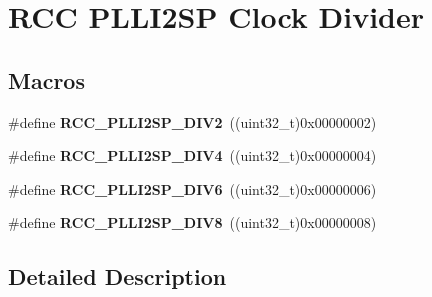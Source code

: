 \hypertarget{group___r_c_c_ex___p_l_l_i2_s_p___clock___divider}{}\section{R\+CC P\+L\+L\+I2\+SP Clock Divider}
\label{group___r_c_c_ex___p_l_l_i2_s_p___clock___divider}
\subsection*{Macros}
\begin{DoxyCompactItemize}
\item 
\#define {\bfseries R\+C\+C\+\_\+\+P\+L\+L\+I2\+S\+P\+\_\+\+D\+I\+V2}~((uint32\+\_\+t)0x00000002)\hypertarget{group___r_c_c_ex___p_l_l_i2_s_p___clock___divider_gac21a8fef45936bccd505019187d36464}{}\label{group___r_c_c_ex___p_l_l_i2_s_p___clock___divider_gac21a8fef45936bccd505019187d36464}

\item 
\#define {\bfseries R\+C\+C\+\_\+\+P\+L\+L\+I2\+S\+P\+\_\+\+D\+I\+V4}~((uint32\+\_\+t)0x00000004)\hypertarget{group___r_c_c_ex___p_l_l_i2_s_p___clock___divider_gac59b669903c841d46cc552887749807a}{}\label{group___r_c_c_ex___p_l_l_i2_s_p___clock___divider_gac59b669903c841d46cc552887749807a}

\item 
\#define {\bfseries R\+C\+C\+\_\+\+P\+L\+L\+I2\+S\+P\+\_\+\+D\+I\+V6}~((uint32\+\_\+t)0x00000006)\hypertarget{group___r_c_c_ex___p_l_l_i2_s_p___clock___divider_ga4f6407aa49b6d86cb036f68de40b7301}{}\label{group___r_c_c_ex___p_l_l_i2_s_p___clock___divider_ga4f6407aa49b6d86cb036f68de40b7301}

\item 
\#define {\bfseries R\+C\+C\+\_\+\+P\+L\+L\+I2\+S\+P\+\_\+\+D\+I\+V8}~((uint32\+\_\+t)0x00000008)\hypertarget{group___r_c_c_ex___p_l_l_i2_s_p___clock___divider_ga6782f70e94478ecc4c3b86365a9b32cd}{}\label{group___r_c_c_ex___p_l_l_i2_s_p___clock___divider_ga6782f70e94478ecc4c3b86365a9b32cd}

\end{DoxyCompactItemize}


\subsection{Detailed Description}
